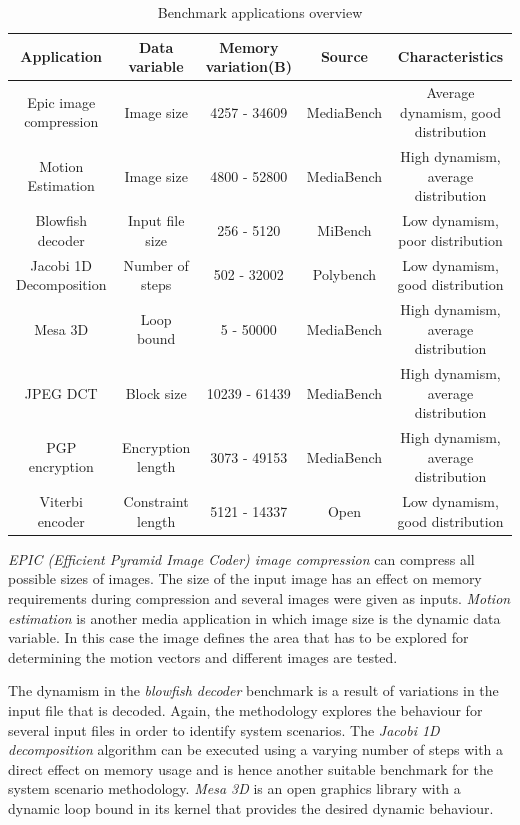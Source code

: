 \documentclass[a4paper,conference]{IEEEtran}
\begin{document}
\begin{center}
\begin{table}[!t]
\caption{Benchmark applications overview}
\label{tab:applications}
{\small
\hfill{}
\begin{tabular}{|c|c|c|c|c|}
\hline 
\textbf{Application} & \textbf{Data variable} & \textbf{Memory variation(B)} & \textbf{Source} & \textbf{Characteristics}\\ 
\hline 
Epic image compression & Image size & 4257 - 34609 & MediaBench & Average dynamism, good distribution\\ 
\hline 
Motion Estimation & Image size & 4800 - 52800 & MediaBench & High dynamism, average distribution\\ 
\hline 
Blowfish decoder & Input file size & 256 - 5120 & MiBench & Low dynamism, poor distribution\\ 
\hline 
Jacobi 1D Decomposition & Number of steps & 502 - 32002 & Polybench & Low dynamism, good distribution\\ 
\hline 
Mesa 3D & Loop bound & 5 - 50000 & MediaBench & High dynamism, average distribution\\ 
\hline 
JPEG DCT & Block size & 10239 - 61439 & MediaBench & High dynamism, average distribution\\ 
\hline 
PGP encryption & Encryption length & 3073 - 49153 & MediaBench & High dynamism, average distribution\\ 
\hline 
Viterbi encoder & Constraint length & 5121 - 14337 & Open & Low dynamism, good distribution\\ 
\hline 
\end{tabular}}
\end{table}
\end{center}

\textit{EPIC (Efficient Pyramid Image Coder) image compression} can compress all possible sizes of images. The size of the input image has an effect on memory requirements during compression and several images were given as inputs. \textit{Motion estimation} is another media application in which image size is the dynamic data variable. In this case the image defines the area that has to be explored for determining the motion vectors and different images are tested.

The dynamism in the \textit{blowfish decoder} benchmark is a result of variations in the input file that is decoded. Again, the methodology explores the behaviour for several input files in order to identify system scenarios. The \textit{Jacobi 1D decomposition} algorithm can be executed using a varying number of steps with a direct effect on memory usage and is hence another suitable benchmark for the system scenario methodology. \textit{Mesa 3D} is an open graphics library with a dynamic loop bound in its kernel that provides the desired dynamic behaviour. 
\end{document}
